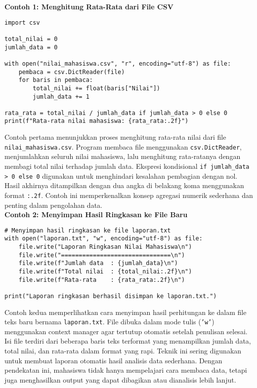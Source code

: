 \noindent\textbf{Contoh 1: Menghitung Rata-Rata dari File CSV}

\begin{lstlisting}[style=PythonStyle, caption={Menghitung rata-rata nilai mahasiswa dari file CSV}]
import csv

total_nilai = 0
jumlah_data = 0

with open("nilai_mahasiswa.csv", "r", encoding="utf-8") as file:
    pembaca = csv.DictReader(file)
    for baris in pembaca:
        total_nilai += float(baris["Nilai"])
        jumlah_data += 1

rata_rata = total_nilai / jumlah_data if jumlah_data > 0 else 0
print(f"Rata-rata nilai mahasiswa: {rata_rata:.2f}")
\end{lstlisting}

Contoh pertama menunjukkan proses menghitung rata-rata nilai dari file \texttt{nilai\_mahasiswa.csv}. Program membaca file menggunakan \texttt{csv.DictReader}, menjumlahkan seluruh nilai mahasiswa, lalu menghitung rata-ratanya dengan membagi total nilai terhadap jumlah data. Ekspresi kondisional \texttt{if jumlah\_data > 0 else 0} digunakan untuk menghindari kesalahan pembagian dengan nol. Hasil akhirnya ditampilkan dengan dua angka di belakang koma menggunakan format \texttt{:.2f}. Contoh ini memperkenalkan konsep agregasi numerik sederhana dan penting dalam pengolahan data.\\

\noindent\textbf{Contoh 2: Menyimpan Hasil Ringkasan ke File Baru}

\begin{lstlisting}[style=PythonStyle, caption={Menyimpan hasil ringkasan dalam file teks terformat}]
# Menyimpan hasil ringkasan ke file laporan.txt
with open("laporan.txt", "w", encoding="utf-8") as file:
    file.write("Laporan Ringkasan Nilai Mahasiswa\n")
    file.write("===============================\n")
    file.write(f"Jumlah data  : {jumlah_data}\n")
    file.write(f"Total nilai  : {total_nilai:.2f}\n")
    file.write(f"Rata-rata    : {rata_rata:.2f}\n")

print("Laporan ringkasan berhasil disimpan ke laporan.txt.")
\end{lstlisting}

Contoh kedua memperlihatkan cara menyimpan hasil perhitungan ke dalam file teks baru bernama \texttt{laporan.txt}. File dibuka dalam mode tulis (\texttt{'w'}) menggunakan context manager agar tertutup otomatis setelah penulisan selesai. Isi file terdiri dari beberapa baris teks terformat yang menampilkan jumlah data, total nilai, dan rata-rata dalam format yang rapi. Teknik ini sering digunakan untuk membuat laporan otomatis hasil analisis data sederhana. Dengan pendekatan ini, mahasiswa tidak hanya mempelajari cara membaca data, tetapi juga menghasilkan output yang dapat dibagikan atau dianalisis lebih lanjut.

